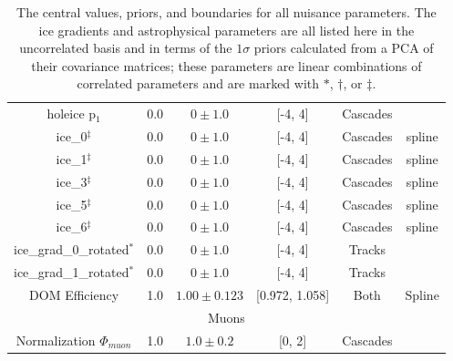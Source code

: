 \documentclass[main.tex]{subfiles}
\begin{document}
\begin{table}
\begin{tabular}{c | ccccc}
        holeice p$_{1}$ & 0.0 & $0\pm 1.0$ & [-4, 4]&Cascades & \\
        ice\_0$^{\ddag}$ & 0.0 & $0\pm 1.0$ & [-4, 4]&Cascades & spline \\
        ice\_1$^{\ddag}$ & 0.0 & $0\pm 1.0$ & [-4, 4]&Cascades & spline \\
        ice\_3$^{\ddag}$ & 0.0 & $0\pm 1.0$ & [-4, 4]&Cascades & spline \\
        ice\_5$^{\ddag}$ & 0.0 & $0\pm 1.0$ & [-4, 4]&Cascades & spline \\
        ice\_6$^{\ddag}$ & 0.0 & $0\pm 1.0$ & [-4, 4]&Cascades & spline \\
        ice\_grad\_0\_rotated$^{*}$ & 0.0 & $0\pm 1.0$ & [-4, 4] & Tracks & \\
        ice\_grad\_1\_rotated$^{*}$ & 0.0 & $0\pm 1.0$ & [-4, 4]& Tracks & \\
        DOM Efficiency & 1.0 & $1.00\pm0.123$ & [0.972, 1.058] & Both & Spline \\
        \multicolumn{6}{c}{Muons} \\\hline
        Normalization $\Phi_{muon}$ & 1.0 & $1.0\pm0.2$ & [0, 2] & Cascades & \\        
    \end{tabular}
    \caption{The central values, priors, and boundaries for all nuisance parameters. The ice gradients and astrophysical parameters are all listed here in the uncorrelated basis and in terms of the $1\sigma$ priors calculated from a PCA of their covariance matrices; these parameters are linear combinations of correlated parameters and are marked with $*$, $\dag$, or $\ddag$.}\label{table:nutrition}
\end{table}
\end{document}

